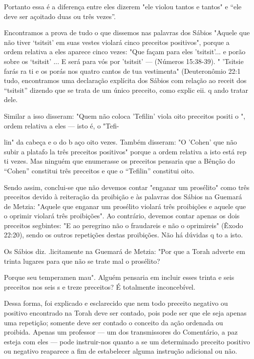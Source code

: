 Portanto essa é a diferença entre eles dizerem "ele violou tantos e
tantos" e ``ele deve ser açoitado duas ou três vezes''.

Encontramos a prova de tudo o que dissemos nas palavras dos Sá­bios
"Aquele que não tiver `tsitsit' em suas vestes violará cinco preceitos
posi­tivos", porque a ordem relativa a eles aparece cinco vezes: "Que
façam para eles 'tsitsit'... e porão sobre os `tsitsit' ... E será para
vós por 'tsitsit' ---  (Números 15:38-39). " 'Tsitsie
farás ra ti e os porás nos quatro cantos de tua vestimen­ta"
(Deuteronômio 22:1 tudo, encontramos uma declaração explícita dos Sábios
com relação ao receit dos ``tsitsit'' dizendo que se trata de um único
preceito, como explic eii. q ando tratar dele.

Similar a isso disseram: "Quem não coloca 'Tefilin' viola 
oito preceitos positi o ", ordem relativa a eles --- isto é, o "Tefi-

lin" da cabeça e o do b aço oito vezes. Também disseram: "O 'Cohen' 
que não subir a platafo la três preceitos positivos" porque a ordem 
relativa a isto está rep ti vezes. Mas ninguém que enumerasse os
preceitos pensaria que a Bênção do ``Cohen'' constitui três preceitos e
que o ``Tefilin'' constitui oito.

Sendo assim, conclui-se que não devemos contar "enganar um pro­sélito"
como três preceitos devido à reiteração da proibição e às palavras dos
Sábios na Guemará de Metzia: "Aquele que enganar um prosélito violará
três proibições e aquele que o oprimir violará três proibições". Ao
contrário, deve­mos contar apenas os dois preceitos segbintes: "E ao
peregrino não o frauda­reis e não o oprimireis" (Êxodo 22:20), sendo os
outros repetições destas proi­bições. Não há dúvidas q to a isto.

Os Sábios diz. .licitamente na Guemará de Metzia: "Por que a
Torah adverte em trinta lugares para que não se trate mal o prosélito?

Porque seu temperamen mau". Alguém pensaria em incluir esses trinta
e seis preceitos nos seis s e treze preceitos? É totalmente
inconcebível.

  
 
Dessa forma, foi explicado e esclarecido que nem todo preceito ne­gativo
ou positivo encontrado na Torah deve ser contado, pois pode ser que ele
seja apenas uma repetição; somente deve ser contado o conceito da ação
ordenada ou proibida. Apenas um professor --- um dos transmissores do
Co­mentário, a paz esteja com eles --- pode instruir-nos quanto a se um
determina­do preceito positivo ou negativo reaparece a fim de
estabelecer alguma instru­ção adicional ou não.

